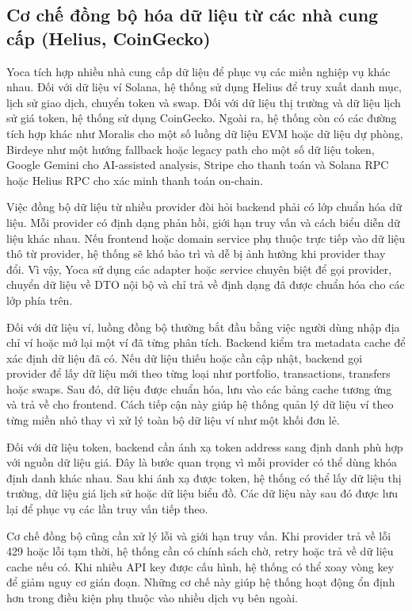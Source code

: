 \subsection{Cơ chế đồng bộ hóa dữ liệu từ các nhà cung cấp (Helius, CoinGecko)}

Yoca tích hợp nhiều nhà cung cấp dữ liệu để phục vụ các miền nghiệp vụ khác nhau. Đối với dữ liệu ví Solana, hệ thống sử dụng Helius để truy xuất danh mục, lịch sử giao dịch, chuyển token và swap. Đối với dữ liệu thị trường và dữ liệu lịch sử giá token, hệ thống sử dụng CoinGecko. Ngoài ra, hệ thống còn có các đường tích hợp khác như Moralis cho một số luồng dữ liệu EVM hoặc dữ liệu dự phòng, Birdeye như một hướng fallback hoặc legacy path cho một số dữ liệu token, Google Gemini cho AI-assisted analysis, Stripe cho thanh toán và Solana RPC hoặc Helius RPC cho xác minh thanh toán on-chain.

Việc đồng bộ dữ liệu từ nhiều provider đòi hỏi backend phải có lớp chuẩn hóa dữ liệu. Mỗi provider có định dạng phản hồi, giới hạn truy vấn và cách biểu diễn dữ liệu khác nhau. Nếu frontend hoặc domain service phụ thuộc trực tiếp vào dữ liệu thô từ provider, hệ thống sẽ khó bảo trì và dễ bị ảnh hưởng khi provider thay đổi. Vì vậy, Yoca sử dụng các adapter hoặc service chuyên biệt để gọi provider, chuyển dữ liệu về DTO nội bộ và chỉ trả về định dạng đã được chuẩn hóa cho các lớp phía trên.

Đối với dữ liệu ví, luồng đồng bộ thường bắt đầu bằng việc người dùng nhập địa chỉ ví hoặc mở lại một ví đã từng phân tích. Backend kiểm tra metadata cache để xác định dữ liệu đã có. Nếu dữ liệu thiếu hoặc cần cập nhật, backend gọi provider để lấy dữ liệu mới theo từng loại như portfolio, transactions, transfers hoặc swaps. Sau đó, dữ liệu được chuẩn hóa, lưu vào các bảng cache tương ứng và trả về cho frontend. Cách tiếp cận này giúp hệ thống quản lý dữ liệu ví theo từng miền nhỏ thay vì xử lý toàn bộ dữ liệu ví như một khối đơn lẻ.

Đối với dữ liệu token, backend cần ánh xạ token address sang định danh phù hợp với nguồn dữ liệu giá. Đây là bước quan trọng vì mỗi provider có thể dùng khóa định danh khác nhau. Sau khi ánh xạ được token, hệ thống có thể lấy dữ liệu thị trường, dữ liệu giá lịch sử hoặc dữ liệu biểu đồ. Các dữ liệu này sau đó được lưu lại để phục vụ các lần truy vấn tiếp theo.

Cơ chế đồng bộ cũng cần xử lý lỗi và giới hạn truy vấn. Khi provider trả về lỗi 429 hoặc lỗi tạm thời, hệ thống cần có chính sách chờ, retry hoặc trả về dữ liệu cache nếu có. Khi nhiều API key được cấu hình, hệ thống có thể xoay vòng key để giảm nguy cơ gián đoạn. Những cơ chế này giúp hệ thống hoạt động ổn định hơn trong điều kiện phụ thuộc vào nhiều dịch vụ bên ngoài.



